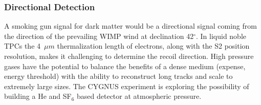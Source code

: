 \subsubsection{Directional Detection}

A smoking gun signal for dark matter would be a directional signal coming from the direction of the prevailing WIMP wind at declination 42$^\circ$.
In liquid noble TPCs the 4~$\mu m$ thermalization length of electrons, along with the S2 position resolution, makes it challenging to determine the recoil direction.
High pressure gases have the potential to balance the benefits of a dense medium (expense, energy threshold) with the ability to reconstruct long tracks and scale to extremely large sizes.
The CYGNUS experiment is exploring the possibility of building a He and SF$_6$ based detector at atmospheric pressure\cite{vahsen_cygnus_2020}.

